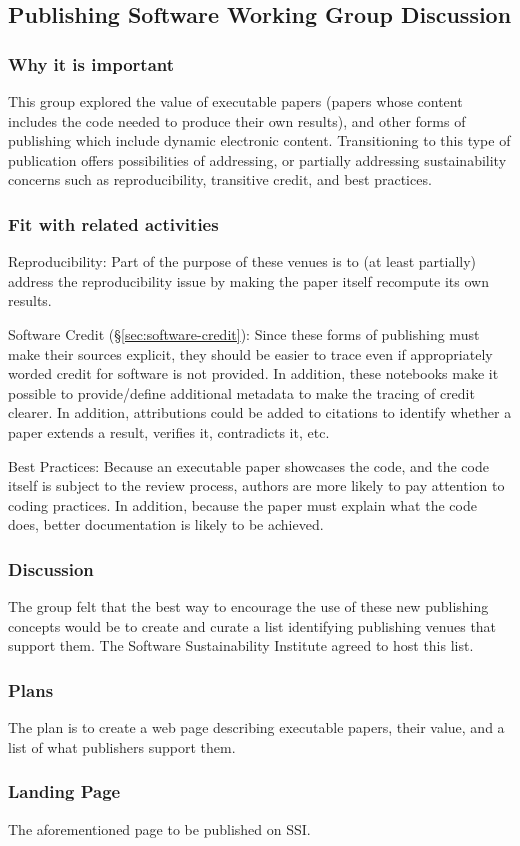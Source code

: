 \subsection{Publishing Software Working Group Discussion} \label{sec:publishing-software}

\subsubsection{Why it is important}

This group explored the value of executable papers (papers whose content includes
the code needed to produce their own results), and other forms of publishing which
include dynamic electronic content. Transitioning to this type of publication offers
possibilities of addressing, or partially addressing sustainability concerns 
such as reproducibility, transitive credit, and best practices.

\subsubsection{Fit with related activities}

Reproducibility: Part of the purpose of these venues is to (at least partially)
address the reproducibility issue by making the paper itself recompute its own
results.

Software Credit (\S\ref{sec:software-credit}): Since these forms of publishing must make their sources explicit,
they should be easier to trace even if appropriately worded credit for software
is not provided. In addition, these notebooks make it possible to provide/define
additional metadata to make the tracing of credit clearer. In addition, attributions
could be added to citations to identify whether a paper extends a result, verifies it,
contradicts it, etc.

Best Practices: Because an executable paper showcases the code, and the code itself
is subject to the review process, authors are more likely to pay attention to coding
practices. In addition, because the paper must explain what the code does, better
documentation is likely to be achieved.

\subsubsection{Discussion}

The group felt that the best way to encourage the use of these new publishing
concepts would be to create and curate a list identifying publishing venues
that support them. The Software Sustainability Institute agreed to host this list.

\subsubsection{Plans}

The plan is to create a web page describing executable papers, their value, and
a list of what publishers support them.

\subsubsection{Landing Page}

The aforementioned page to be published on SSI.
